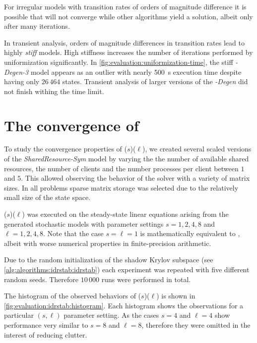 For irregular models with transition rates of orders of magnitude
difference it is possible that  will not converge
while other algorithms yield a solution, albeit only after many
iterations.

In transient analysis, orders of magnitude differences in transition
rates lead to highly \emph{stiff} models. High stiffness increases the
number of iterations performed by uniformization significantly. In
\cref{fig:evaluation:uniformization-time}, the stiff
\emph{-Degen-3} model appears as an outlier with nearly
500~s execution time despite having only $26\,464$ states. Transient
analysis of larger versions of the \emph{-Degen} did not
finish withing the time limit.

\section{The convergence of }
\label{sec:evaulations:idrstab}

To study the convergence properties of
($s$)($\ell$), we created several scaled
versions of the \emph{SharedResource-Sym} model by varying the the
number of available shared resources, the number of clients and the
number processes per client between $1$ and $5$. This allowed
observing the behavior of the solver with a variety of matrix
sizes. In all problems sparse matrix storage was selected due to the
relatively small size of the state space.

($s$)($\ell$) was executed on the
steady-state linear equations arising from the generated stochastic
models with parameter settings $s = 1, 2, 4, 8$ and $\ell = 1, 2, 4,
8$. Note that the case $s = \ell = 1$ is mathematically equivalent to
, albeit with worse numerical properties in
finite-precision arithmetic.

Due to the random initialization of the shadow Krylov subspace (see
\vref{alg:algorithms:idrstab:idrstab}) each experiment was repeated
with five different random seeds. Therefore $10\,000$ runs were
performed in total.

The histogram of the observed behaviors of
($s$)($\ell$) is shown in
\cref{fig:evaluation:idrstab:histogram}. Each histogram shows the
observations for a particular $(s, \ell)$ parameter setting. As the
cases $s = 4$ and $\ell = 4$ show performance very similar to $s = 8$
and $\ell = 8$, therefore they were omitted in the interest of
reducing clutter.

